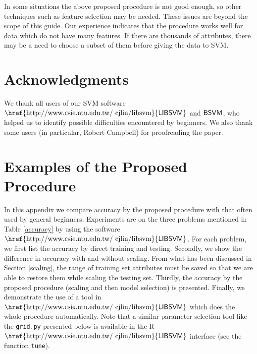 \documentclass[12pt]{article}
\newcommand{\libsvm}{$\mbox{\href{http://www.csie.ntu.edu.tw/~cjlin/libsvm}{\sf LIBSVM}}$\xspace}
\newcommand{\bsvm}{$\mbox{{\sf BSVM}}$\xspace}
\begin{document}
In some situations the above proposed procedure is not good enough, so
other techniques such as feature selection may be needed. These issues
are beyond the scope of this guide. Our experience indicates that the
procedure works well for data which do not have many features.  If
there are thousands of attributes, there may be a need to choose a
subset of them before giving the data to SVM.

\section*{Acknowledgments}
We thank all users of our SVM software \libsvm and \bsvm, who helped
us to identify possible difficulties encountered by beginners. We also thank some users (in particular, Robert Campbell) for proofreading the paper.

\appendix

\section{Examples of the Proposed Procedure}
\label{app}

In this appendix we compare accuracy by the proposed procedure with
that often used by general beginners.  Experiments are on the three
problems mentioned in Table \ref{accuracy} by using the software
\libsvm \citep{CC01a}. For each problem, we first list the accuracy by
direct training and testing. Secondly, we show the difference in
accuracy with and without scaling.  From what has been discussed in
Section \ref{scaling}, the range of training set attributes must be
saved so that we are able to restore them while scaling the testing
set.  Thirdly, the accuracy by the proposed procedure (scaling and
then model selection) is presented. Finally, we demonstrate the use of
a tool in \libsvm which does the whole procedure automatically. Note
that a similar parameter selection tool like the {\tt grid.py}
presented below is available in the R-\libsvm interface (see the
function {\tt tune}).
\end{document}
